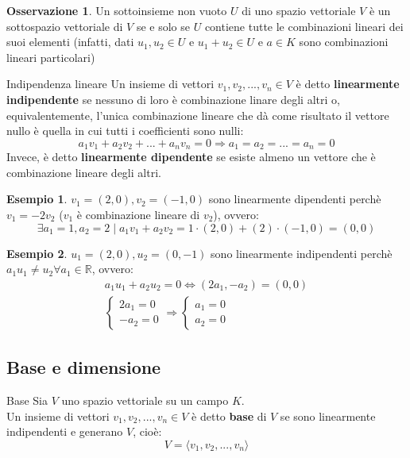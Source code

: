 \documentclass[a4paper]{article}
\theoremstyle{definition}
\newtheorem*{oss}{Osservazione}
\newtheorem*{es}{Esempio}
\begin{document}
\begin{oss}
	Un sottoinsieme non vuoto $U$ di uno spazio vettoriale $V$ è un sottospazio vettoriale di $V$ se e solo se $U$ contiene tutte le combinazioni lineari dei suoi elementi (infatti, dati $u_1, u_2 \in U$ e $u_1 + u_2 \in U$ e $a \in K$ sono combinazioni lineari particolari)
\end{oss}

\begin{deff}{Indipendenza lineare}{}
	Un insieme di vettori $v_1, v_2, ..., v_n \in V$ è detto \textbf{linearmente indipendente} se nessuno di loro è combinazione linare degli altri o, equivalentemente,
	l'unica combinazione lineare che dà come risultato il vettore nullo è quella in cui tutti i coefficienti sono nulli:
	\[ a_1v_1 + a_2v_2 + ... + a_nv_n = 0 \Rightarrow a_1 = a_2 = ... = a_n = 0 \]
	Invece, è detto \textbf{linearmente dipendente} se esiste almeno un vettore che è combinazione lineare degli altri.
\end{deff}
\begin{es}
	$v_1 = (2, 0), v_2 = (-1, 0)$ sono linearmente dipendenti perchè $v_1 = -2v_2$ ($v_1$ è combinazione lineare di $v_2$), ovvero:
	\[ \exists a_1 = 1, a_2 = 2 \mid a_1v_1 + a_2v_2 = 1 \cdot (2, 0) + (2) \cdot (-1, 0) = (0, 0) \]
\end{es}
\begin{es}
	$u_1 = (2, 0), u_2 = (0, -1)$ sono linearmente indipendenti perchè $a_1u_1 \ne u_2 \forall a_1 \in \mathbb{R}$, ovvero:
	\begin{align*}
		a_1u_1 + a_2u_2 = 0 \Leftrightarrow (2a_1, - a_2) = (0, 0) \\
		\begin{cases}
			2a_1 = 0 \\
			-a_2 = 0
		\end{cases}
		\Rightarrow
		\begin{cases}
			a_1 = 0 \\
			a_2 = 0
		\end{cases}
	\end{align*}
\end{es}

\subsection{Base e dimensione}
\begin{deff}{Base}{}
	Sia $V$ uno spazio vettoriale su un campo $K$. \\
	Un insieme di vettori $v_1, v_2, ..., v_n \in V$ è detto \textbf{base} di $V$ se sono linearmente indipendenti e generano $V$, cioè:
	\[ V = \langle v_1, v_2, ..., v_n \rangle \]
\end{deff}
\end{document}
